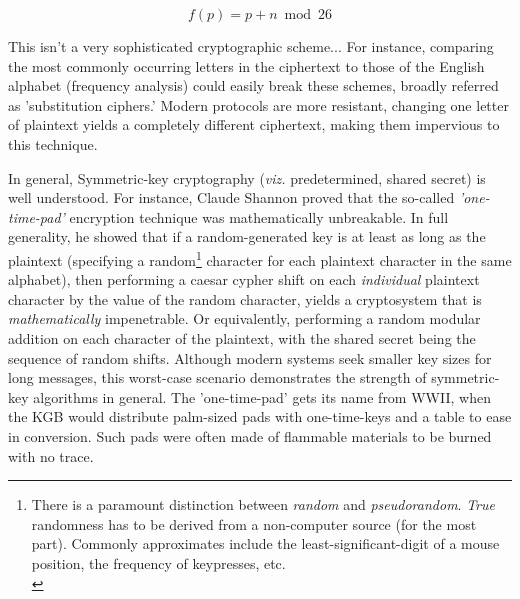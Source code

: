 \documentclass[11pt, a4paper]{report}
\begin{document}
\[
f(p) = p + n \bmod 26 
\]




This isn't a very sophisticated cryptographic scheme... For instance, comparing the most commonly occurring letters in the ciphertext to those of the English alphabet (frequency analysis) could easily break these schemes, broadly referred as 'substitution ciphers.'\autocite[54]{koblitz} 
Modern protocols are more resistant, changing one letter of plaintext yields a completely different ciphertext, making them impervious to this technique.   
  
 In general, Symmetric-key cryptography (\textit{viz.} predetermined, shared secret) is well understood. For instance, Claude Shannon proved that the so-called \textit{'one-time-pad'} encryption technique was mathematically unbreakable. 
In full generality, he showed that if a random-generated key is at least as long as the plaintext (specifying a random\footnote{There is a paramount distinction between \textit{random} and \textit{pseudorandom}. \textit{True} randomness has to be derived from a non-computer source (for the most part). Commonly approximates include the least-significant-digit of a mouse position, the frequency of keypresses, etc.\\\autocite[92]{koblitz}} character for each plaintext character in the same alphabet), then performing a caesar cypher shift on each \textit{individual} plaintext character by the value of the random character, yields a cryptosystem that is \textit{mathematically} impenetrable. 
Or equivalently, performing a random modular addition on each character of the plaintext, with the shared secret being the sequence of random shifts.\autocite{claude} %
Although modern systems seek smaller key sizes for long messages, this worst-case scenario demonstrates the strength of symmetric-key algorithms in general. The 'one-time-pad' gets its name from WWII, when the KGB would distribute palm-sized pads with one-time-keys and a table to ease in conversion. Such pads were often made of flammable materials to be burned with no trace.\autocite{lewand} 
  
\end{document}
